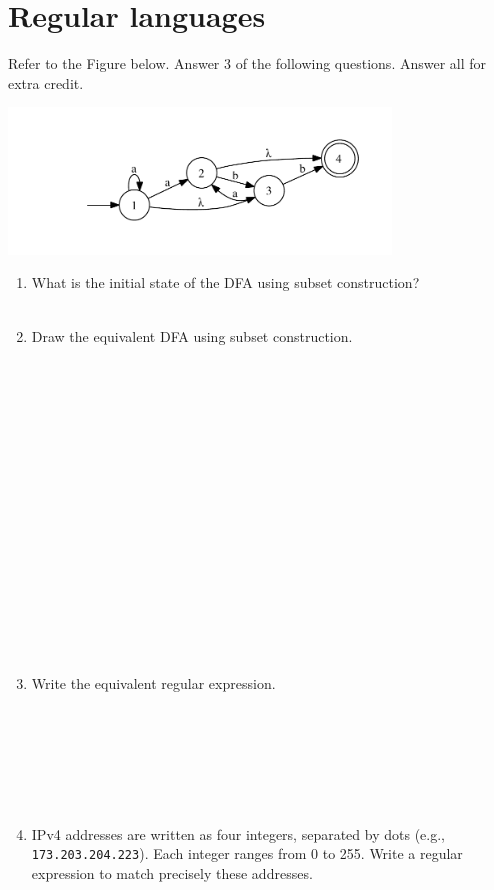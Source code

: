 \documentclass[10pt]{amsart}
\begin{document}
\section{Regular languages}
Refer to the Figure below. Answer 3 of the following questions. Answer all for extra credit.
\begin{center}
\includegraphics[width=4in]{nfa}
\end{center}
\begin{enumerate}
\item What is the initial state of the DFA using subset construction?\\\\\underline{\hspace{5.18in}}
\item Draw the equivalent DFA using subset construction.\\\\\\\\\\\\\\\\\\\\\\\\\\\\\\\\\\
\item Write the equivalent regular expression.\\\\\\\\\\\\\\
\item IPv4 addresses are written as four integers, separated by dots (e.g., \verb+173.203.204.223+). Each integer ranges from 0 to 255. Write a regular expression to match precisely these addresses.
\end{enumerate}
\end{document}
